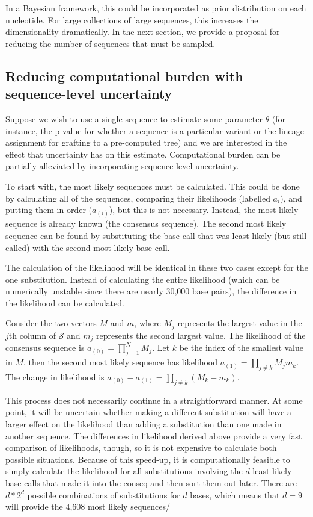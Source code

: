\documentclass[
]{article}
\newcommand{\nps}{\mathcal{S}} %
\begin{document}
In a Bayesian framework, this could be incorporated as prior
distribution on each nucleotide. For large collections of large
sequences, this increases the dimensionality dramatically. In the next
section, we provide a proposal for reducing the number of sequences that
must be sampled.

\hypertarget{reducing-computational-burden-with-sequence-level-uncertainty}{%
\subsection{Reducing computational burden with sequence-level
uncertainty}\label{reducing-computational-burden-with-sequence-level-uncertainty}}

Suppose we wish to use a single sequence to estimate some parameter
\(\theta\) (for instance, the p-value for whether a sequence is a
particular variant or the lineage assignment for grafting to a
pre-computed tree) and we are interested in the effect that uncertainty
has on this estimate. Computational burden can be partially alleviated
by incorporating sequence-level uncertainty.

To start with, the most likely sequences must be calculated. This could
be done by calculating all of the sequences, comparing their likelihoods
(labelled \(a_i\)), and putting them in order (\(a_{(i)}\)), but this is
not necessary. Instead, the most likely sequence is already known (the
consensus sequence). The second most likely sequence can be found by
substituting the base call that was least likely (but still called) with
the second most likely base call.

The calculation of the likelihood will be identical in these two cases
except for the one substitution. Instead of calculating the entire
likelihood (which can be numerically unstable since there are nearly
30,000 base pairs), the difference in the likelihood can be calculated.

Consider the two vectors \(M\) and \(m\), where \(M_j\) represents the
largest value in the \(j\)th column of \(\nps\) and \(m_j\) represents
the second largest value. The likelihood of the consensus sequence is
\(a_{(0)} = \prod_{j=1}^NM_j\). Let \(k\) be the index of the smallest
value in \(M\), then the second most likely sequence has likelihood
\(a_{(1)} = \prod_{j\ne k}M_jm_k\). The change in likelihood is
\(a_{(0)} - a_{(1)} = \prod_{j\ne k}(M_k - m_k)\).

This process does not necessarily continue in a straightforward manner.
At some point, it will be uncertain whether making a different
substitution will have a larger effect on the likelihood than adding a
substitution than one made in another sequence. The differences in
likelihood derived above provide a very fast comparison of likelihoods,
though, so it is not expensive to calculate both possible situations.
Because of this speed-up, it is computationally feasible to simply
calculate the likelihood for all substitutions involving the \(d\) least
likely base calls that made it into the conseq and then sort them out
later. There are \(d*2^d\) possible combinations of substitutions for
\(d\) bases, which means that \(d=9\) will provide the 4,608 most likely
sequences/
\end{document}
